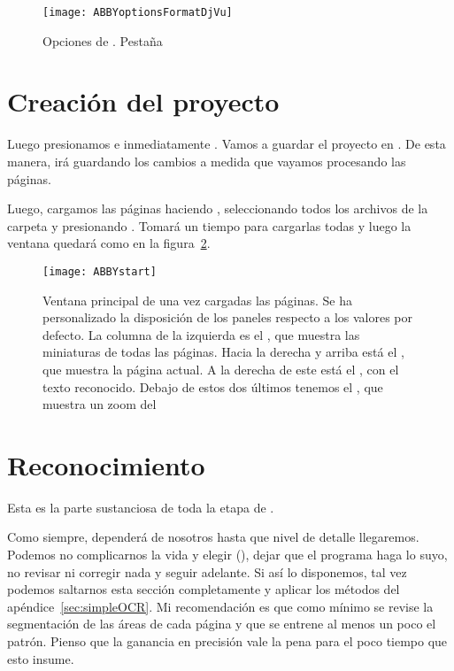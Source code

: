 \documentclass[%
	a5paper,
	10pt,
	twoside,
	openright,
	final,
]{memoir}
\begin{document}
	\begin{figure}
		\texttt{[image: ABBYoptionsFormatDjVu]}
		\caption[Opciones de \abby. Pestaña Format Settings >\ DjVu]{Opciones de \abby. Pestaña \label{fig:ABBYoptionsFormatDjVu}}
	\end{figure}

	\section{Creación del proyecto} Luego presionamos  e inmediatamente . Vamos a guardar el proyecto en . De esta manera, \abby irá guardando los cambios a medida que vayamos procesando las páginas.

	Luego, cargamos las páginas haciendo , seleccionando todos los archivos de la carpeta  y presionando . Tomará un tiempo para cargarlas todas y luego la ventana quedará como en la figura~\ref{fig:ABBYstart}.

	\begin{figure}
		\centering
		\texttt{[image: ABBYstart]}
		\caption[Ventana principal de \abby una vez cargadas las páginas]{Ventana principal de \abby una vez cargadas las páginas. Se ha personalizado la disposición de los paneles respecto a los valores por defecto. La columna de la izquierda es el , que muestra las miniaturas de todas las páginas. Hacia la derecha y arriba está el , que muestra la página actual. A la derecha de este está el , con el texto reconocido. Debajo de estos dos últimos tenemos el , que muestra un zoom del \label{fig:ABBYstart}}
	\end{figure}

	\section{Reconocimiento} Esta es la parte sustanciosa de toda la etapa de \ocr.

	Como siempre, dependerá de nosotros hasta que nivel de detalle llegaremos. Podemos no complicarnos la vida y elegir  (), dejar que el programa haga lo suyo, no revisar ni corregir nada y seguir adelante. Si así lo disponemos, tal vez podemos saltarnos esta sección completamente y aplicar los métodos del apéndice~\ref{sec:simpleOCR}. Mi recomendación es que como mínimo se revise la segmentación de las áreas de cada página y que se entrene al menos un poco el patrón. Pienso que la ganancia en precisión vale la pena para el poco tiempo que esto insume.
\end{document}
